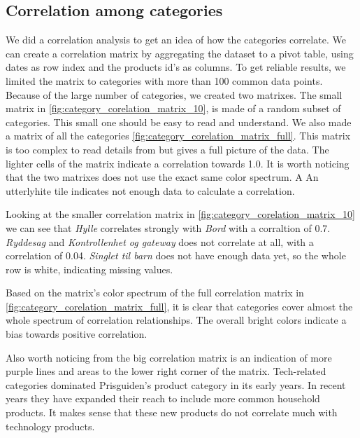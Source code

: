 \subsection{Correlation among categories}
We did a correlation analysis to get an idea of how the categories correlate.
We can create a correlation matrix by aggregating the dataset to a pivot table, using dates as row index and the products id's as columns.
To get reliable results, we limited the matrix to categories with more than 100 common data points.
Because of the large number of categories, we created two matrixes. The small matrix in \autoref{fig:category_corelation_matrix_10},
is made of a random subset of categories.
This small one should be easy to read and understand.
We also made a matrix of all the categories \autoref{fig:category_corelation_matrix_full}. This matrix is too complex to read details from but gives a full picture of the data.
The lighter cells of the matrix indicate a correlation towards 1.0. It is worth noticing that the two matrixes does not use the exact same color spectrum.
A An utterlyhite tile indicates not enough data to calculate a correlation.

Looking at the smaller correlation matrix in \autoref{fig:category_corelation_matrix_10} we can see that
\textit{Hylle} correlates strongly  with \textit{Bord} with a corraltion of 0.7.
\textit{Ryddesag} and \textit{Kontrollenhet og gateway} does not correlate at all, with a correlation of 0.04.
\textit{Singlet til barn} does not have enough data yet, so the whole row is white, indicating missing values.


Based on the matrix's color spectrum of the full correlation matrix in \autoref{fig:category_corelation_matrix_full}, it is clear that categories cover almost the whole spectrum of correlation relationships.
The overall bright colors indicate a bias towards positive correlation.

Also worth noticing from the big correlation matrix is an indication of more purple lines and areas to the lower right corner of the matrix.
Tech-related categories dominated Prisguiden's product category in its early years. In recent years they have expanded their reach to include more common household
products. It makes sense that these new products do not correlate much with technology products.

